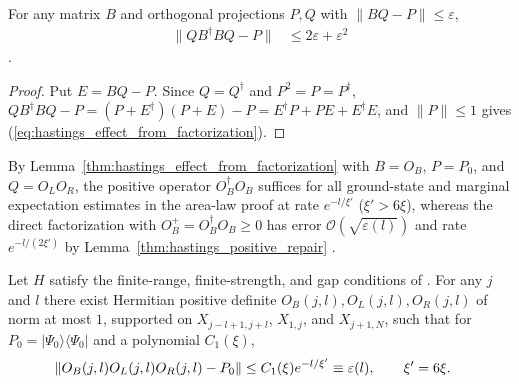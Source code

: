 \begin{lemma}
    \label{thm:hastings_effect_from_factorization}
    \leanok
    For any matrix $B$ and orthogonal projections $P,Q$ with
    $\|BQ-P\|\le\varepsilon$,
    \begin{align}
        \|QB^\dagger BQ-P\| & \le2\varepsilon+\varepsilon^2
        \label{eq:hastings_effect_from_factorization}
    \end{align}
    \cite[lines 916--925]{Hastings2007AreaLaw}.
\end{lemma}
\begin{proof}\leanok
    Put $E=BQ-P$. Since $Q=Q^\dagger$ and $P^2=P=P^\dagger$,
    $QB^\dagger BQ-P=(P+E^\dagger)(P+E)-P=E^\dagger P+PE+E^\dagger E$, and
    $\|P\|\le1$ gives (\ref{eq:hastings_effect_from_factorization}).
\end{proof}

By Lemma~\ref{thm:hastings_effect_from_factorization} with $B=O_B$, $P=P_0$,
and $Q=O_LO_R$, the positive operator $O_B^\dagger O_B$ suffices for all
ground-state and marginal expectation estimates in the area-law proof at rate
$e^{-l/\xi'}$ ($\xi'>6\xi$), whereas the direct factorization with
$O_B^+=O_B^\dagger O_B\ge0$ has error $\mathcal O(\sqrt{\varepsilon(l)})$ and
rate $e^{-l/(2\xi')}$ by Lemma~\ref{thm:hastings_positive_repair}
\cite[lines 932--940]{Hastings2007AreaLaw}.

\begin{theorem}
    \label{lem:hastings_lemma1}
    Let $H$ satisfy the finite-range, finite-strength, and gap conditions of
    \cite[Lemma~1, lines 246--267]{Hastings2007AreaLaw}. For any $j$ and $l$
    there exist Hermitian positive definite $O_B(j,l),O_L(j,l),O_R(j,l)$ of
    norm at most $1$, supported on $X_{j-l+1,j+l}$, $X_{1,j}$, and
    $X_{j+1,N}$, such that for $P_0=|\Psi_0\rangle\langle\Psi_0|$ and a
    polynomial $C_1(\xi)$,
    \begin{align}
        \|O_B(j,l)O_L(j,l)O_R(j,l)-P_0\| & \le C_1(\xi)e^{-l/\xi'}
        \equiv\varepsilon(l),\qquad\xi'=6\xi.
        \notag
    \end{align}
\end{theorem}

